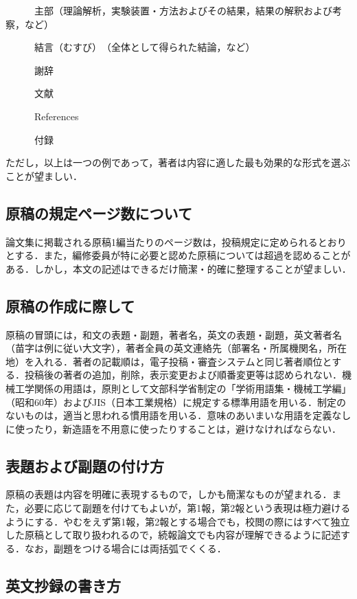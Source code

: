 \documentclass[a4jsme, fleqn, dvipdfmx]{jsmepaper}
\begin{document}
　　　主部（理論解析，実験装置・方法およびその結果，結果の解釈および考察，など）

　　　結言（むすび）　（全体として得られた結論，など）

　　　謝辞

　　　文献

　　　References

　　　付録

ただし，以上は一つの例であって，著者は内容に適した最も効果的な形式を選ぶことが望ましい．

\subsection{原稿の規定ページ数について}

論文集に掲載される原稿1編当たりのページ数は，投稿規定に定められるとおりとする．また，編修委員が特に必要と認めた原稿については超過を認めることがある．しかし，本文の記述はできるだけ簡潔・的確に整理することが望ましい．

\subsection{原稿の作成に際して}

原稿の冒頭には，和文の表題・副題，著者名，英文の表題・副題，英文著者名（苗字は例に従い大文字），著者全員の英文連絡先（部署名・所属機関名，所在地）を入れる．著者の記載順は，電子投稿・審査システムと同じ著者順位とする．投稿後の著者の追加，削除，表示変更および順番変更等は認められない．機械工学関係の用語は，原則として文部科学省制定の「学術用語集・機械工学編」（昭和60年）およびJIS（日本工業規格）に規定する標準用語を用いる．制定のないものは，適当と思われる慣用語を用いる．意味のあいまいな用語を定義なしに使ったり，新造語を不用意に使ったりすることは，避けなければならない．

\subsection{表題および副題の付け方}

原稿の表題は内容を明確に表現するもので，しかも簡潔なものが望まれる．また，必要に応じて副題を付けてもよいが，第1報，第2報という表現は極力避けるようにする．やむをえず第1報，第2報とする場合でも，校閲の際にはすべて独立した原稿として取り扱われるので，続報論文でも内容が理解できるように記述する．なお，副題をつける場合には両括弧でくくる．

\subsection{英文抄録の書き方}
\end{document}
